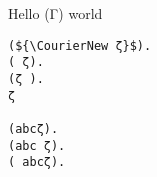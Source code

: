 \documentclass{article}
\begin{document}
Hello (Γ) world

\begin{lstlisting}
(${\CourierNew ζ}$).
( ζ).
(ζ ).
ζ

(abcζ).
(abc ζ).
( abcζ).
\end{lstlisting}
\end{document}
